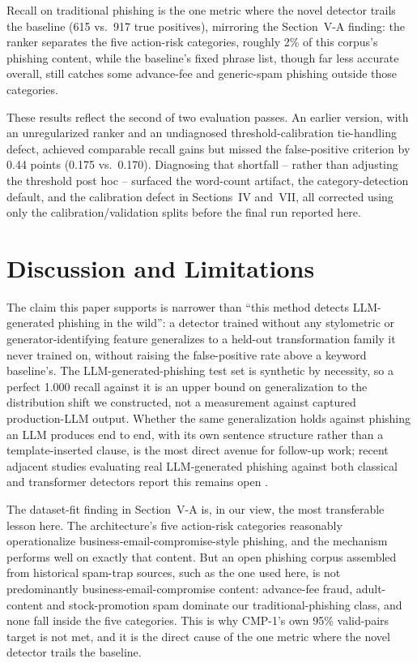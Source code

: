 \documentclass[conference]{IEEEtran}
\begin{document}
Recall on traditional phishing is the one metric where the novel detector trails the baseline (615 vs.\ 917 true positives), mirroring the Section~V-A finding: the ranker separates the five action-risk categories, roughly 2\% of this corpus's phishing content, while the baseline's fixed phrase list, though far less accurate overall, still catches some advance-fee and generic-spam phishing outside those categories.

These results reflect the second of two evaluation passes. An earlier version, with an unregularized ranker and an undiagnosed threshold-calibration tie-handling defect, achieved comparable recall gains but missed the false-positive criterion by 0.44 points (0.175 vs.\ 0.170). Diagnosing that shortfall -- rather than adjusting the threshold post hoc -- surfaced the word-count artifact, the category-detection default, and the calibration defect in Sections~IV and~VII, all corrected using only the calibration/validation splits before the final run reported here.

\section{Discussion and Limitations}

The claim this paper supports is narrower than ``this method detects LLM-generated phishing in the wild'': a detector trained without any stylometric or generator-identifying feature generalizes to a held-out transformation family it never trained on, without raising the false-positive rate above a keyword baseline's. The LLM-generated-phishing test set is synthetic by necessity, so a perfect 1.000 recall against it is an upper bound on generalization to the distribution shift we constructed, not a measurement against captured production-LLM output. Whether the same generalization holds against phishing an LLM produces end to end, with its own sentence structure rather than a template-inserted clause, is the most direct avenue for follow-up work; recent adjacent studies evaluating real LLM-generated phishing against both classical and transformer detectors report this remains open \cite{kulal2025robust,chen2025sok}.

The dataset-fit finding in Section~V-A is, in our view, the most transferable lesson here. The architecture's five action-risk categories reasonably operationalize business-email-compromise-style phishing, and the mechanism performs well on exactly that content. But an open phishing corpus assembled from historical spam-trap sources, such as the one used here, is not predominantly business-email-compromise content: advance-fee fraud, adult-content and stock-promotion spam dominate our traditional-phishing class, and none fall inside the five categories. This is why CMP-1's own 95\% valid-pairs target is not met, and it is the direct cause of the one metric where the novel detector trails the baseline.
\end{document}
